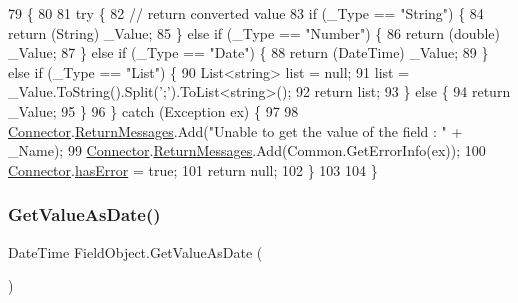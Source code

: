 \begin{DoxyCode}
79                              \{
80 
81         \textcolor{keywordflow}{try} \{
82             \textcolor{comment}{// return converted value}
83             \textcolor{keywordflow}{if} (\_Type == \textcolor{stringliteral}{"String"}) \{
84                 \textcolor{keywordflow}{return} (String) \_Value;
85             \} \textcolor{keywordflow}{else} \textcolor{keywordflow}{if} (\_Type == \textcolor{stringliteral}{"Number"}) \{
86                 \textcolor{keywordflow}{return} (\textcolor{keywordtype}{double}) \_Value;
87             \} \textcolor{keywordflow}{else} \textcolor{keywordflow}{if} (\_Type == \textcolor{stringliteral}{"Date"}) \{
88                 \textcolor{keywordflow}{return} (DateTime) \_Value;
89             \} \textcolor{keywordflow}{else} \textcolor{keywordflow}{if} (\_Type == \textcolor{stringliteral}{"List"}) \{
90                 List<string> list = null;
91                 list = \_Value.ToString().Split(\textcolor{charliteral}{';'}).ToList<\textcolor{keywordtype}{string}>();
92                 \textcolor{keywordflow}{return} list;
93             \} \textcolor{keywordflow}{else} \{
94                 \textcolor{keywordflow}{return} \_Value;
95             \}
96         \} \textcolor{keywordflow}{catch} (Exception ex) \{
97 
98             \hyperlink{class_connector}{Connector}.\hyperlink{class_connector_a1ed422674b344524fd77998dcf6a9ba6}{ReturnMessages}.Add(\textcolor{stringliteral}{"Unable to get the value of the field : "} +
       \_Name);
99             \hyperlink{class_connector}{Connector}.\hyperlink{class_connector_a1ed422674b344524fd77998dcf6a9ba6}{ReturnMessages}.Add(Common.GetErrorInfo(ex));
100             \hyperlink{class_connector}{Connector}.\hyperlink{class_connector_a079bae21a5417efa53bfe8954c0f533f}{hasError} = \textcolor{keyword}{true};
101             \textcolor{keywordflow}{return} null;
102         \}
103       
104     \}
\end{DoxyCode}
\mbox{\label{class_field_object_a797ebc6615a86bafd9bd17f09562f2ee}} 
\subsubsection{\texorpdfstring{Get\+Value\+As\+Date()}{GetValueAsDate()}}
{\footnotesize\ttfamily Date\+Time Field\+Object.\+Get\+Value\+As\+Date (\begin{DoxyParamCaption}{ }\end{DoxyParamCaption})}



